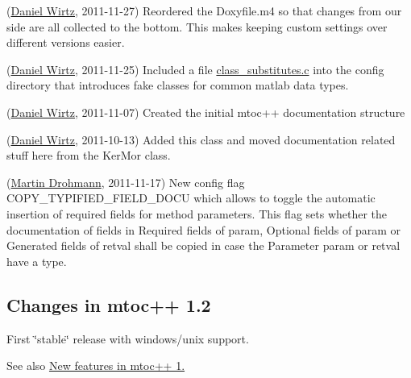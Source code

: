\begin{DoxyRefList}
\item[\label{newfeat1_2__newfeat1_2000003}%
\hypertarget{newfeat1_2__newfeat1_2000003}{}%
Page \hyperlink{changes}{Changes and new features in mtoc++} ](\hyperlink{developers_dw}{Daniel Wirtz}, 2011-\/11-\/27) Reordered the Doxyfile.\+m4 so that changes from our side are all collected to the bottom. This makes keeping custom settings over different versions easier.

(\hyperlink{developers_dw}{Daniel Wirtz}, 2011-\/11-\/25) Included a file \hyperlink{class__substitutes_8c_source}{class\+\_\+substitutes.\+c} into the config directory that introduces fake classes for common matlab data types.

(\hyperlink{developers_dw}{Daniel Wirtz}, 2011-\/11-\/07) Created the initial mtoc++ documentation structure 
\item[\label{newfeat1_2__newfeat1_2000001}%
\hypertarget{newfeat1_2__newfeat1_2000001}{}%
Class \hyperlink{class_matlab_doc_maker}{Matlab\+Doc\+Maker} ](\hyperlink{developers_dw}{Daniel Wirtz}, 2011-\/10-\/13) Added this class and moved documentation related stuff here from the Ker\+Mor class. 
\item[\label{newfeat1_2__newfeat1_2000002}%
\hypertarget{newfeat1_2__newfeat1_2000002}{}%
Class \hyperlink{class_m_file_scanner}{M\+File\+Scanner} ](\hyperlink{developers_md}{Martin Drohmann}, 2011-\/11-\/17) New config flag C\+O\+P\+Y\+\_\+\+T\+Y\+P\+I\+F\+I\+E\+D\+\_\+\+F\+I\+E\+L\+D\+\_\+\+D\+O\+C\+U which allows to toggle the automatic insertion of required fields for method parameters. This flag sets whether the documentation of fields in \textquotesingle{}Required fields of param\textquotesingle{}, \textquotesingle{}Optional fields of param\textquotesingle{} or \textquotesingle{}Generated fields of retval\textquotesingle{} shall be copied in case the Parameter \textquotesingle{}param\textquotesingle{} or \textquotesingle{}retval\textquotesingle{} have a type. 
\end{DoxyRefList}\hypertarget{changelog1_2}{}\subsection{Changes in mtoc++ 1.2}\label{changelog1_2}
First \char`\"{}stable\char`\"{} release with windows/unix support.

See also \hyperlink{newfeat1_2}{New features in mtoc++ 1.}


